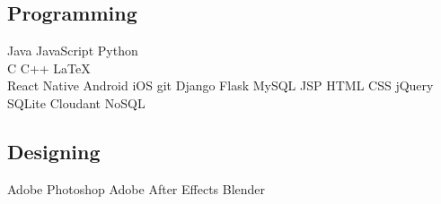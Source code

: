 \documentclass[a4paper]{deedy-resume} %
\begin{document}
\begin{minipage}[t]{0.33\textwidth}
\subsection{Programming}

Java \textbullet{} JavaScript \textbullet{} Python\\
C \textbullet{} C++ \textbullet{} \LaTeX\ \\
React Native \textbullet{} Android \textbullet{} iOS \textbullet{} git \textbullet{} Django \textbullet{} Flask \textbullet{} MySQL \textbullet{} JSP \textbullet{} HTML \textbullet{} CSS \textbullet{} jQuery \textbullet{} SQLite \textbullet{} Cloudant NoSQL

\sectionspace %

\subsection{Designing}
Adobe Photoshop \textbullet{} Adobe After Effects \textbullet{} Blender

\sectionspace %


\end{minipage} %
\hfill
%
%
\end{document}
